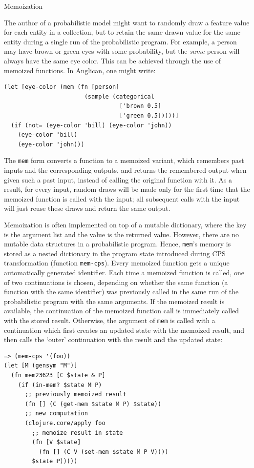 \documentclass[preprint]{sigplanconf}
\begin{document}
\iftoggle{full}{\subsubsection }{\subsection}{Memoization}
\label{sec:mem}

The author of a probabilistic model might want to 
randomly draw a feature value for each entity in a collection,
but to retain the same drawn
value for the same entity during a single run of the probabilistic
program. For example, a person may have brown or green eyes
with some probability, but the \textit{same} person will
always have the same eye color. This can be achieved
through the use of memoized functions. In Anglican, one
might write:
\begin{lstlisting}[style=default]
(let [eye-color (mem (fn [person]
                       (sample (categorical
                                 ['brown 0.5]
                                 ['green 0.5]))))]
  (if (not= (eye-color 'bill) (eye-color 'john))
    (eye-color 'bill)
    (eye-color 'john)))
\end{lstlisting}
The \texttt{mem} form converts a function to a memoized variant,
which remembers past inputs and the corresponding outputs, and 
returns the remembered output when given such a past input, 
instead of calling the original function with it. As a result,
for every input, random draws will be made only for the first time 
that the memoized function is called with the input; all subsequent
calls with the input will just reuse these draws and return the same output.

Memoization is often implemented on top of a mutable
dictionary, where the key is the argument list and the value is
the returned value. However, there are no mutable data
structures in a probabilistic program. Hence, \texttt{mem}'s
memory is stored as a nested dictionary in the program state
introduced during CPS transformation (function \texttt{mem-cps}).  
Every memoized function gets a
unique automatically generated identifier. Each time a memoized
function is called, one of two continuations is chosen,
depending on whether the same function (a function with the same
identifier) was previously called in the same run of the
probabilistic program with the same arguments. If the memoized
result is available, the continuation of the memoized function
call is immediately called with the stored result. Otherwise,
the argument of \texttt{mem} is called with a continuation which
first creates an updated state with the memoized result, and
then calls the `outer' continuation with the result and the
updated state:
\begin{lstlisting}[style=default]
=> (mem-cps '(foo))
(let [M (gensym "M")]
  (fn mem23623 [C $state & P]
    (if (in-mem? $state M P)
      ;; previously memoized result
      (fn [] (C (get-mem $state M P) $state))
      ;; new computation
      (clojure.core/apply foo
        ;; memoize result in state
        (fn [V $state]
          (fn [] (C V (set-mem $state M P V))))
        $state P)))))
\end{lstlisting}
\end{document}
